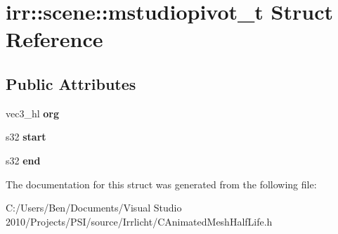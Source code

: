 \hypertarget{structirr_1_1scene_1_1mstudiopivot__t}{\section{irr\-:\-:scene\-:\-:mstudiopivot\-\_\-t Struct Reference}
\label{structirr_1_1scene_1_1mstudiopivot__t}
}
\subsection*{Public Attributes}
\begin{DoxyCompactItemize}
\item 
\hypertarget{structirr_1_1scene_1_1mstudiopivot__t_a61e58167c64bbaa408c12f0f8a0e6407}{vec3\-\_\-hl {\bfseries org}}\label{structirr_1_1scene_1_1mstudiopivot__t_a61e58167c64bbaa408c12f0f8a0e6407}

\item 
\hypertarget{structirr_1_1scene_1_1mstudiopivot__t_a1f1c0e31d8b84cd1a4458ff78006f015}{s32 {\bfseries start}}\label{structirr_1_1scene_1_1mstudiopivot__t_a1f1c0e31d8b84cd1a4458ff78006f015}

\item 
\hypertarget{structirr_1_1scene_1_1mstudiopivot__t_a97033da37c11b66c75f36ef6f0685960}{s32 {\bfseries end}}\label{structirr_1_1scene_1_1mstudiopivot__t_a97033da37c11b66c75f36ef6f0685960}

\end{DoxyCompactItemize}


The documentation for this struct was generated from the following file\-:\begin{DoxyCompactItemize}
\item 
C\-:/\-Users/\-Ben/\-Documents/\-Visual Studio 2010/\-Projects/\-P\-S\-I/source/\-Irrlicht/C\-Animated\-Mesh\-Half\-Life.\-h\end{DoxyCompactItemize}
